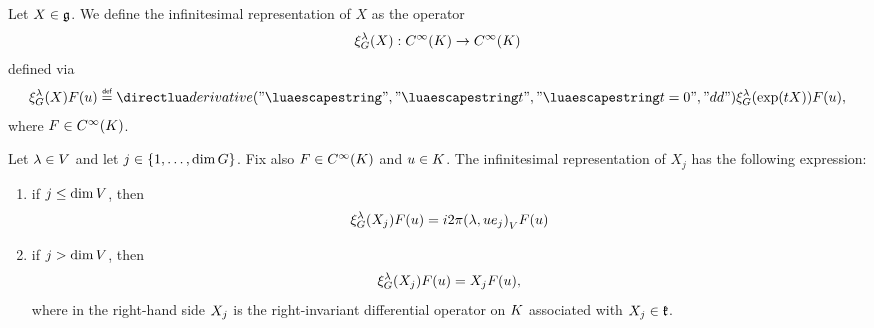 \begin{definition}
\label{definition:infinitesimal_representation}
    Let $X \in \mathfrak{g}$.
    We define the infinitesimal representation of $X$ as the operator
    \begin{align*}
        \xi^{\lambda}_{G}(X) : {C^\infty(K)} \to {C^\infty(K)}
    \end{align*}
    defined via
    \begin{align*}
        \Rep{\lambda}(X) F(u) \defeq \D*{t}<t=0> \Rep{\lambda}(\exp(t X)) F(u),
    \end{align*}
    where $F \in {C^\infty(K)}$.
\end{definition}

\begin{proposition}
\label{proposition:infinitesimal_representations_of_differential_operators}
    Let $\lambda \in V$ and let $j \in \{1, \dots, \dim G\}$.
    Fix also $F \in {C^\infty(K)}$ and $u \in K$.
    The infinitesimal representation of $X_j$ has the following expression:
    \begin{enumerate}
        \item if $j \leq \dim V$, then
            \begin{align*}
                \xi^{\lambda}_{G}(X_j) F(u) = i 2 \pi {\left(\lambda, u e_j\right)_{V}} F(u)
            \end{align*}
        \item if $j > \dim V$, then
            \begin{align*}
                \xi^{\lambda}_{G}(X_j) F(u) = {X_j} F(u),
            \end{align*}
            where in the right-hand side ${X_j}$ is the right-invariant differential operator on $K$ associated with $X_j \in \mathfrak{k}$.
    \end{enumerate}
\end{proposition}
